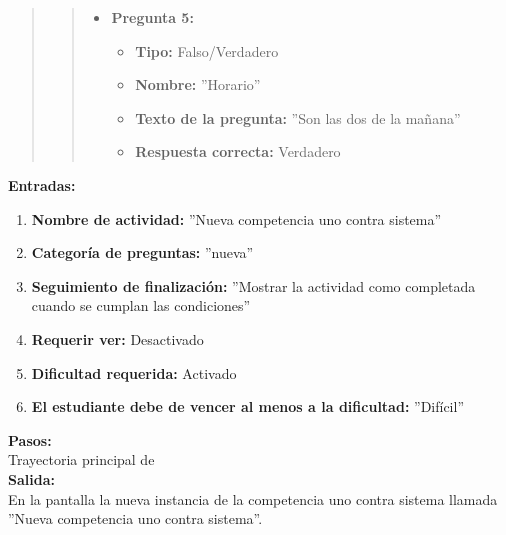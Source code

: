 \begin{quote}
\begin{quote}
\begin{itemize}
                \item \textbf{Pregunta 5:}
                \begin{itemize}
                  \item \textbf{Tipo:} Falso/Verdadero
                  \item \textbf{Nombre:} ''Horario''
                  \item \textbf{Texto de la pregunta:} ''Son las dos de la mañana''
                  \item \textbf{Respuesta correcta:} Verdadero
                \end{itemize}

            \end{itemize}
    \end{quote}


\end{quote}

    \textbf{Entradas:}\\
    \begin{enumerate}
        \item \textbf{Nombre de actividad:} ''Nueva competencia uno contra sistema''
        \item \textbf{Categoría de preguntas:} ''nueva''
        \item \textbf{Seguimiento de finalización:} ''Mostrar la actividad como completada cuando se cumplan las condiciones''
        \item \textbf{Requerir ver:} Desactivado
        \item \textbf{Dificultad requerida:} Activado
        \item \textbf{El estudiante debe de vencer al menos a la dificultad:} ''Difícil''
    \end{enumerate}
    \textbf{Pasos:}\\

    Trayectoria principal de \\

    \textbf{Salida:}\\

     En la pantalla  la nueva instancia de la competencia uno contra sistema llamada ''Nueva competencia uno contra sistema''.
